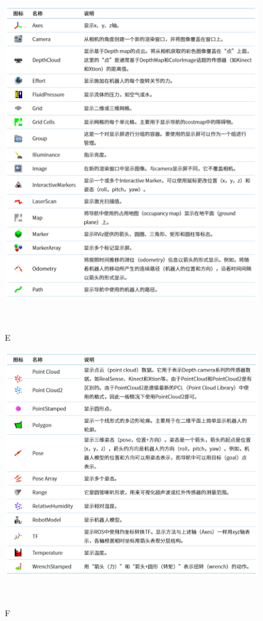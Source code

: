 \documentclass[geye,green,kindle,cn]{elegantnote}
\begin{document}
\begin{figure}[htbp]
    \centering
    \includegraphics[width=1\linewidth]{src/E.png}
    \centering
    \caption{E} \label{picture:E}
\end{figure}

\begin{figure}[htbp]
    \centering
    \includegraphics[width=1\linewidth]{src/F.png}
    \centering
    \caption{F} \label{picture:F}
\end{figure}
\end{document}
